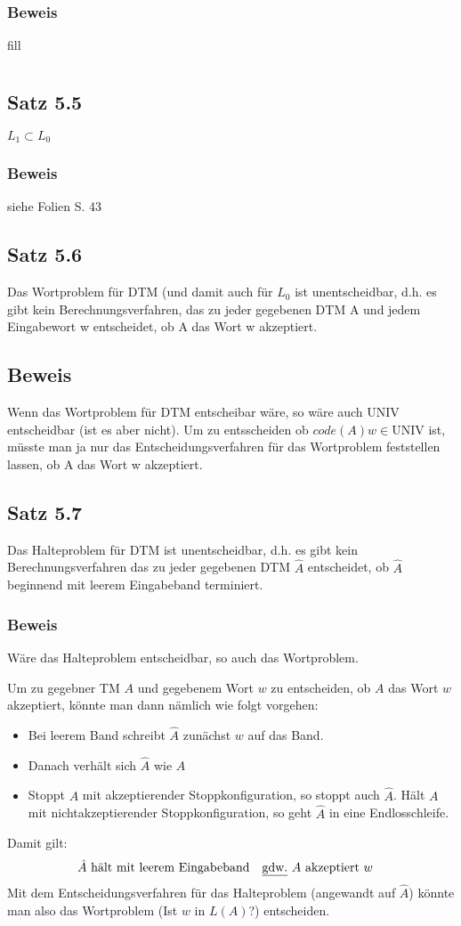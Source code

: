 \subsubsection{Beweis}
fill
\section{}
\subsection{Satz 5.5}
$L_1 \subset L_0$\\
\subsubsection{Beweis}
siehe Folien S. 43
\subsection{Satz 5.6}
Das Wortproblem für DTM (und damit auch für $L_0$ ist unentscheidbar, d.h. es gibt kein Berechnungsverfahren, das zu jeder gegebenen DTM A und jedem Eingabewort w entscheidet, ob A das Wort w akzeptiert.
\subsection{Beweis}
Wenn das Wortproblem für DTM entscheibar wäre, so wäre auch UNIV entscheidbar (ist es aber nicht). Um zu entsscheiden ob $code(A)w \in \text{UNIV}$ ist, müsste man ja nur das Entscheidungsverfahren für das Wortproblem feststellen lassen, ob A das Wort w akzeptiert.
\subsection{Satz 5.7}
Das Halteproblem für DTM ist unentscheidbar, d.h. es gibt kein Berechnungsverfahren das zu jeder gegebenen DTM $\hat A$ entscheidet, ob $\hat A$ beginnend mit leerem Eingabeband terminiert.
\subsubsection{Beweis}
Wäre das Halteproblem entscheidbar, so auch das Wortproblem. \par 
Um zu gegebner TM $A$ und gegebenem Wort $w$ zu entscheiden, ob $A$ das Wort $w$ akzeptiert, könnte man dann nämlich wie folgt vorgehen:\par 
\begin{itemize}
	\item Bei leerem Band schreibt $\hat A$ zunächst $w$ auf das Band.
	\item Danach verhält sich $\hat A$ wie $A$
	\item Stoppt $A$ mit akzeptierender Stoppkonfiguration, so stoppt auch $\hat A$. Hält $A$ mit nichtakzeptierender Stoppkonfiguration, so geht $\hat A$ in eine Endlosschleife.
\end{itemize}
Damit gilt:
\begin{align*}
	&\hat A \text{ hält mit leerem Eingabeband} &&\text{\underline{gdw.} } A \text{ akzeptiert }w
\end{align*}
Mit dem Entscheidungsverfahren für das Halteproblem (angewandt auf $\hat A$) könnte man also das Wortproblem (Ist $w$ in $L(A)$?) entscheiden.
